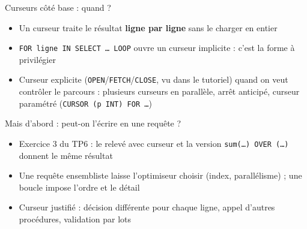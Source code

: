 \documentclass[aspectratio=169,10pt]{beamer}
\begin{document}
\begin{frame}{Curseurs c\^ot\'e base : quand ?}
  \begin{itemize}
    \item Un curseur traite le r\'esultat \textbf{ligne par ligne} sans le charger en entier
    \item \texttt{FOR ligne IN SELECT \ldots{} LOOP} ouvre un curseur implicite : c'est la forme \`a privil\'egier
    \item Curseur explicite (\texttt{OPEN}/\texttt{FETCH}/\texttt{CLOSE}, vu dans le tutoriel) quand on veut contr\^oler le parcours :
      plusieurs curseurs en parall\`ele, arr\^et anticip\'e, curseur param\'etr\'e (\texttt{CURSOR (p INT) FOR \ldots})
  \end{itemize}
  \begin{block}{Mais d'abord : peut-on l'\'ecrire en une requ\^ete ?}
    \begin{itemize}
      \item Exercice 3 du TP6 : le relev\'e avec curseur et la version \texttt{sum(\ldots) OVER (\ldots)} donnent le m\^eme r\'esultat
      \item Une requ\^ete ensembliste laisse l'optimiseur choisir (index, parall\'elisme) ; une boucle impose l'ordre et le d\'etail
      \item Curseur justifi\'e : d\'ecision diff\'erente pour chaque ligne, appel d'autres proc\'edures, validation par lots
    \end{itemize}
  \end{block}
\end{frame}
\end{document}
